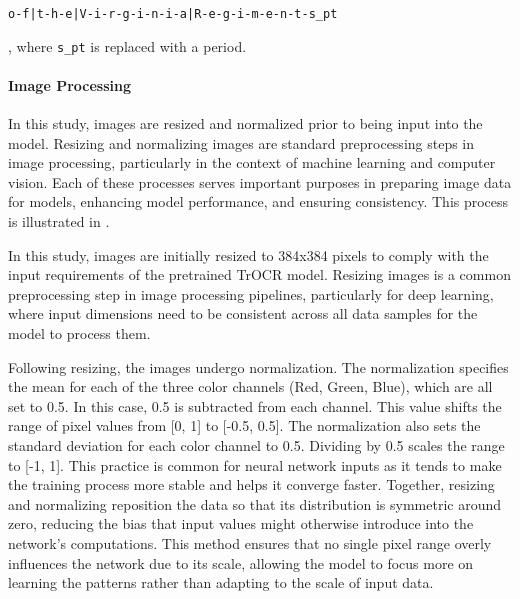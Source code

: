 \begin{center}
    \texttt{o-f|t-h-e|V-i-r-g-i-n-i-a|R-e-g-i-m-e-n-t-s\_pt} 
\end{center}

, where \texttt{s\_pt} is replaced with a period.

\paragraph*{Image Processing}
\label{par:3_image_processing}
In this study, images are resized and normalized prior to being input into the model. Resizing and normalizing images are standard preprocessing steps in image processing, particularly in the context of machine learning and computer vision. Each of these processes serves important purposes in preparing image data for models, enhancing model performance, and ensuring consistency. This process is illustrated in .

In this study, images are initially resized to 384x384 pixels to comply with the input requirements of the pretrained TrOCR model. Resizing images is a common preprocessing step in image processing pipelines, particularly for deep learning, where input dimensions need to be consistent across all data samples for the model to process them.

Following resizing, the images undergo normalization. The normalization specifies the mean for each of the three color channels (Red, Green, Blue), which are all set to 0.5. In this case, 0.5 is subtracted from each channel. This value shifts the range of pixel values from [0, 1] to [-0.5, 0.5]. The normalization also sets the standard deviation for each color channel to 0.5. Dividing by 0.5 scales the range to [-1, 1]. This practice is common for neural network inputs as it tends to make the training process more stable and helps it converge faster. Together, resizing and normalizing reposition the data so that its distribution is symmetric around zero, reducing the bias that input values might otherwise introduce into the network's computations. This method ensures that no single pixel range overly influences the network due to its scale, allowing the model to focus more on learning the patterns rather than adapting to the scale of input data.


